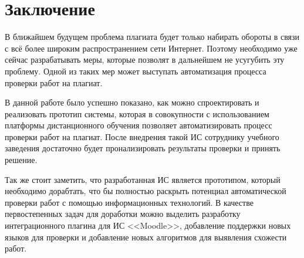\section*{Заключение}

В ближайшем будущем проблема плагиата будет только набирать обороты в связи с всё более широким распространением сети Интернет. Поэтому необходимо уже сейчас разрабатывать меры, которые позволят в дальнейшем не усугубить эту проблему. Одной из таких мер может выступать автоматизация процесса проверки работ на плагиат.

В данной работе было успешно показано, как можно спроектировать и реализовать прототип системы, которая в совокупности с использованием платформы дистанционного обучения позволяет автоматизировать процесс проверки работ на плагиат. После внедрения такой ИС сотруднику учебного заведения достаточно будет пронализировать результаты проверки и принять решение.

Так же стоит заметить, что разработанная ИС является прототипом, который необходимо дорабтать, что бы полностью раскрыть потенциал автоматической проверки работ с помощью информационных технологий. В качестве первостепенных задач для доработки можно выделить разработку интеграционного плагина для ИС <<Moodle>>, добавление поддержки новых языков для проверки и добавление новых алгоритмов для выявления схожести работ.